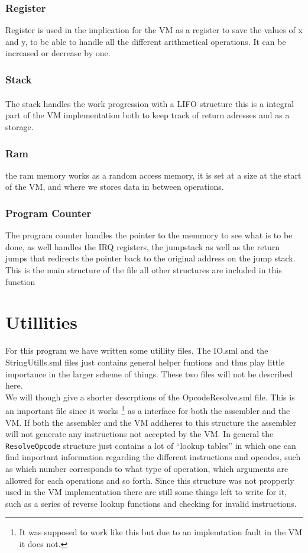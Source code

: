 \documentclass{article}
\newcommand{\V}{\verb}
\begin{document}
\subsubsection{Register}

Register is used in the implication for the VM as a
register to save the values of x and y, to be able to
handle all the different arithmetical operations. It can be increased or
decrease by one.

\subsubsection{Stack}
The stack handles the work progression with a LIFO\textsuperscript{\cite{lifo}}
structure this is a integral part of the VM implementation both to keep track of
return adresses and as a storage.

\subsubsection{Ram}
the ram memory works as a random access memory, it is set at a size
at the start of the VM, and where we stores data in between operations.

\subsubsection{Program Counter}
The program counter handles the pointer to the memmory to see what is to be
done, as well handles the IRQ registers, the jumpstack as well as the
return jumps that redirects the pointer back to the original
address on the jump stack.
This is the main structure of the file all other structures are included in this
function

\section{Utillities}
For this program we have written some utillity files. The IO.sml and the
StringUtills.sml files just contains general helper funtions and thus play
little importance in the larger scheme of things. These two files will not be
described here.
\\
We will though give a shorter descrptions of the OpcodeResolve.sml file. This is
an important file since it works \footnote{It was supposed to work like this
but due to an implemtation fault in the VM it does not.} as a interface for both
the assembler and the VM. If both the assembler and the VM addheres to this
structure the assembler will not generate any instructions not accepted by the
VM. In general the \V+ResolveOpcode+ structure just contains a lot of ``lookup
tables'' in which one can find important information regarding the different
instructions and opcodes, such as which number corresponds to what type of operation, which
arguments are allowed for each operations and so forth.
Since this structure was not propperly used in the VM implementation there are
still some things left to write for it, such as a series of reverse lookup
functions and checking for invalid instructions.
\end{document}
